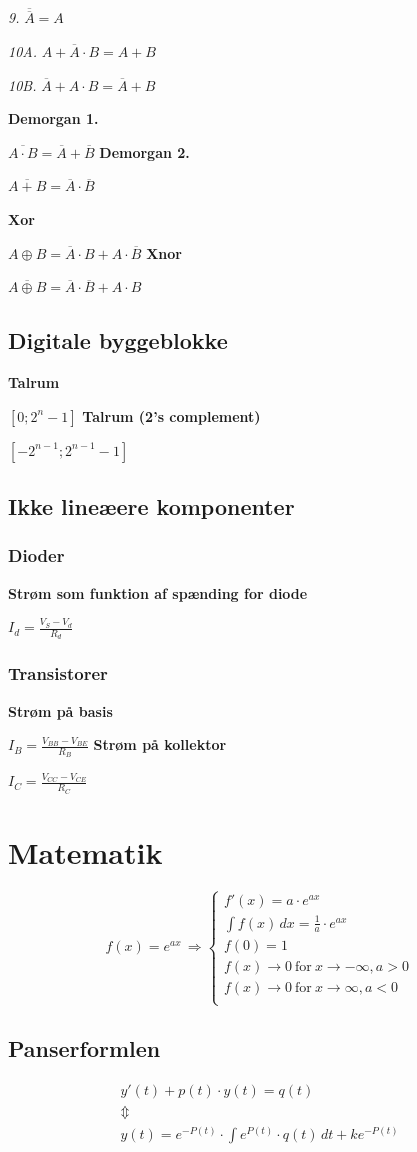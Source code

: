 \documentclass[12pt]{article}
\newcommand{\lov}[2]{{\bf #1}\par\nobreak #2\vskip 5pt}
\newcommand{\regel}[2]{{\it #1} #2\vskip 5pt}
\begin{document}
\regel{9.}{$\overline{\overline A}=A$}

\regel{10A.}{$A+\overline A\cdot B=A+B$}

\regel{10B.}{$\overline A+A\cdot B=\overline A+B$}

\lov{Demorgan 1.}{$\overline{A\cdot B}=\overline A+\overline B$}
\lov{Demorgan 2.}{$\overline{A+ B}=\overline A\cdot\overline B$}

\lov{Xor}{$A\oplus B=\overline A\cdot B+A\cdot\overline B$}
\lov{Xnor}{$\overline{A\oplus B}=\overline A\cdot \overline B+A\cdot B$}

\subsection{Digitale byggeblokke}
\lov{Talrum}{$[0;2^n-1]$}
\lov{Talrum (2's complement)}{$[-2^{n-1};2^{n-1}-1]$}

\subsection{Ikke lineæere komponenter}
\subsubsection{Dioder}
\lov{Strøm som funktion af spænding for diode}{$I_d=\frac{V_S-V_d}{R_d}$}
\subsubsection{Transistorer}
\lov{Strøm på basis}{$I_B=\frac{V_{BB}-V_{BE}}{R_B}$}
\lov{Strøm på kollektor}{$I_C=\frac{V_{CC}-V_{CE}}{R_C}$}

\section{Matematik}
$$
    f(x)=e^{ax}\,\Rightarrow\left\{
	\begin{array}{l}
	    f'(x)=a\cdot e^{ax}\\
	    \int f(x)\,dx=\frac1a\cdot e^{ax}\\
	    f(0)=1\\
	    f(x)\rightarrow0\ \text{for}\ x\rightarrow -\infty,a>0\\
	    f(x)\rightarrow0\ \text{for}\ x\rightarrow \infty,a<0\\
	\end{array}
    \right.
$$
\subsection{Panserformlen}
$$
\begin{array}{l}
    y'(t)+p(t)\cdot y(t)=q(t)\\
    \Updownarrow\\
    y(t)=e^{-P(t)}\cdot\int e^{P(t)}\cdot q(t)\,dt+ke^{-P(t)}
\end{array}
$$
\end{document}
